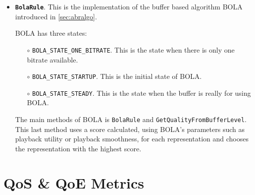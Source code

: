 \begin{itemize}
  \item \textbf{\texttt{BolaRule}}. This is the implementation of the buffer based algorithm
  BOLA introduced in \autoref{sec:abralgo}.

  BOLA has three states:
  \begin{itemize}[noitemsep, topsep=0pt]
    \item[$\circ$] \texttt{BOLA\_STATE\_ONE\_BITRATE}. This is the state when there is only one bitrate available.
    \item[$\circ$] \texttt{BOLA\_STATE\_STARTUP}. This is the initial state of BOLA.
    \item[$\circ$] \texttt{BOLA\_STATE\_STEADY}. This is the state when the buffer is really for using BOLA.
  \end{itemize}

  The main methods of BOLA is \texttt{BolaRule} and \texttt{GetQualityFromBufferLevel}.
  This last method uses a score calculated, using BOLA's parameters such as playback utility or 
  playback smoothness, for each representation and chooses the representation
  with the highest score.
\end{itemize}

\section{QoS \& QoE Metrics}




